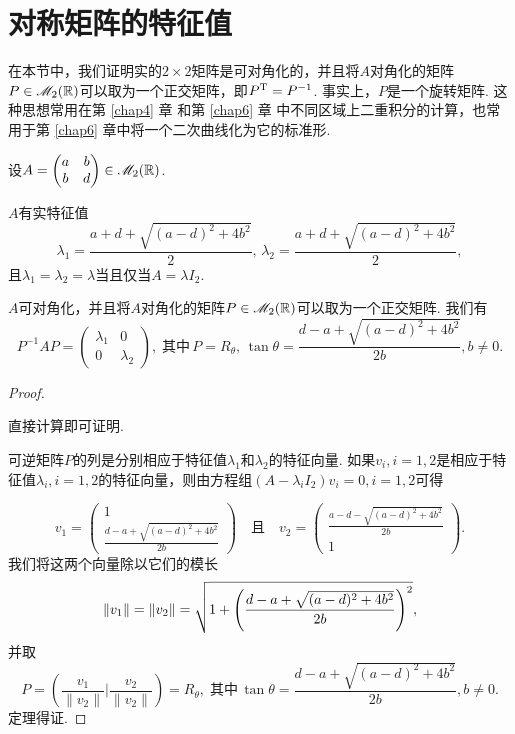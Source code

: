 \section{对称矩阵的特征值}

在本节中，我们证明实的$2\times2$矩阵是可对角化的，并且将$A$对角化的矩阵$P\in\mathscr M_2(\mathbb R)$可以取为一个正交矩阵，即$P^{\mathrm T}=P^{-1}$. 事实上，$P$是一个旋转矩阵. 这种思想常用在第 \ref{chap4} 章 和第 \ref{chap6} 章 中不同区域上二重积分的计算，也常用于第 \ref{chap6} 章中将一个二次曲线化为它的标准形.

\begin{mybox}
  \begin{theorem}[对称矩阵及其特征值.]

  设$A=\begin{pmatrix}
    a & b \\
    b & d
  \end{pmatrix}\in\mathscr M_2(\mathbb R)$.
  \begin{enum}
    \item $A$有实特征值
      \[
        \lambda_1 = \frac{a + d + \sqrt{(a - d)^2 + 4b^2} }2 ,\,\lambda_2 = \frac{a + d + \sqrt{(a - d)^2 + 4b^2 } }2,
      \]
      且$\lambda_1=\lambda_2=\lambda$当且仅当$A=\lambda I_2$.
    \item $A$可对角化，并且将$A$对角化的矩阵$P\in\mathscr M_2(\mathbb R)$可以取为一个正交矩阵. 我们有
        \[
          P^{-1}AP = \begin{pmatrix}
            \lambda_1 & 0 \\
            0 & \lambda_2
          \end{pmatrix},\;\text{其中}\, P=R_\theta,\,\tan\theta =
          \frac{d - a + \sqrt{(a-d)^2+4b^2}}{2b},b\ne0.
        \]
  \end{enum}
  \end{theorem}
\end{mybox}

\begin{proof}
  \begin{enuma}
    \item 直接计算即可证明.
    \item 可逆矩阵$P$的列是分别相应于特征值$\lambda_1$和$\lambda_2$的特征向量. 如果$v_i,i=1,2$是相应于特征值$\lambda_i,i=1,2$的特征向量，则由方程组$(A-\lambda_iI_2)v_i=0,i=1,2$可得
  \end{enuma}
    \[
      v_1 = \begin{pmatrix}
        1 \\
        \frac{d - a + \sqrt{(a - d)^2 + 4b^2} }{2b}
      \end{pmatrix}\quad \text{且}\quad
      v_2 = \begin{pmatrix}
        \frac{a - d - \sqrt{(a - d)^2 + 4b^2} }{2b} \\ 1
      \end{pmatrix}.
    \]
    我们将这两个向量除以它们的模长
    \[
      \| v_1 \| = \| v_2 \| = \SQRT{
        1 + \left( \frac{d - a + \sqrt{(a - d)^2 + 4b^2} }{2b} \right)^2
      },
    \]
    并取
    \[
      P = \left( \frac{v_1}{\|v_2\|}\bigg|
      \frac{v_2}{\|v_2\|} \right) = R_\theta,\;\text{其中}
      \,\tan\theta =
          \frac{d - a + \sqrt{(a-d)^2+4b^2}}{2b},b\ne0.
    \]
    定理得证.
\end{proof}

